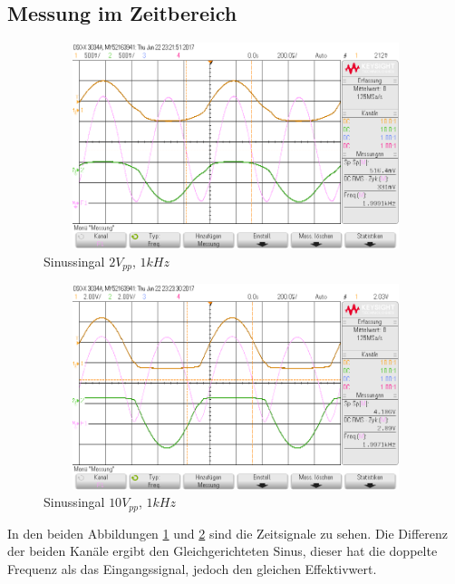 \subsection{Messung im Zeitbereich}
\begin{figure}[H]
 \begin{center}
  \includegraphics[height=6cm,width=12cm]{OsziBilder/bsp4_sin_time_2Vpp_UeUa.png}
 \end{center}
 \caption{Sinussingal $2V_{pp}$, $1kHz$}\label{bsp4_time2V}
\end{figure}
\noindent

\begin{figure}[H]
 \begin{center}
  \includegraphics[height=6cm,width=12cm]{OsziBilder/bsp4_time_10Vpp_UeUa.png}
 \end{center}
 \caption{Sinussingal $10V_{pp}$, $1kHz$}\label{bsp4_time10V}
\end{figure}
\noindent
In den beiden Abbildungen \ref{bsp4_time2V} und \ref{bsp4_time10V} sind die Zeitsignale zu sehen. Die Differenz der beiden Kan\"ale ergibt den Gleichgerichteten Sinus, dieser hat die doppelte Frequenz als das Eingangssignal, jedoch den gleichen Effektivwert.

